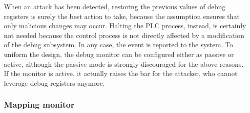 When an attack has been detected, restoring the previous values of debug registers is surely the best action to take,
because the assumption ensures that only malicious changes may occur.
Halting the PLC process, instead, is certainly not needed because the control process is not directly affected by a modification of the debug subsystem.
In any case, the event is reported to the system. To uniform the design, the debug monitor can be configured either as passive or active,
although the passive mode is strongly discouraged for the above reasons. If the monitor is active, it actually raises the bar for the attacker,
who cannot leverage debug registers anymore.


\subsubsection{Mapping monitor}

